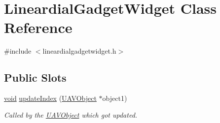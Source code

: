 \hypertarget{class_lineardial_gadget_widget}{\section{\-Lineardial\-Gadget\-Widget \-Class \-Reference}
\label{class_lineardial_gadget_widget}
}


{\ttfamily \#include $<$lineardialgadgetwidget.\-h$>$}

\subsection*{\-Public \-Slots}
\begin{DoxyCompactItemize}
\item 
\hyperlink{group___u_a_v_objects_plugin_ga444cf2ff3f0ecbe028adce838d373f5c}{void} \hyperlink{group___linear_dial_plugin_gae4ba61f22d069348e46919a30913ee34}{update\-Index} (\hyperlink{class_u_a_v_object}{\-U\-A\-V\-Object} $\ast$object1)
\begin{DoxyCompactList}\small\item\em \-Called by the \hyperlink{class_u_a_v_object}{\-U\-A\-V\-Object} which got updated. \end{DoxyCompactList}\end{DoxyCompactItemize}
